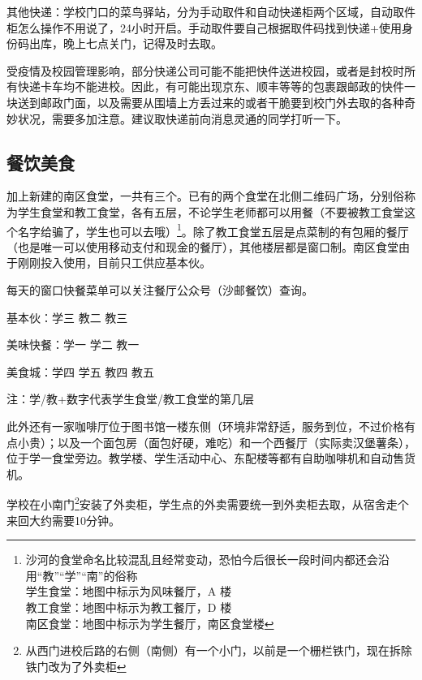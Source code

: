 其他快递：学校门口的菜鸟驿站，分为手动取件和自动快递柜两个区域，自动取件柜怎么操作不用说了，24小时开启。手动取件要自己根据取件码找到快递+使用身份码出库，晚上七点关门，记得及时去取。

受疫情及校园管理影响，部分快递公司可能不能把快件送进校园，或者是封校时所有快递卡车均不能进校。因此，有可能出现京东、顺丰等等的包裹跟邮政的快件一块送到邮政门面，以及需要从围墙上方丢过来的或者干脆要到校门外去取的各种奇妙状况，需要多加注意。建议取快递前向消息灵通的同学打听一下。

\subsection{餐饮美食}


加上新建的南区食堂，一共有三个。已有的两个食堂在北侧二维码广场，分别俗称为学生食堂和教工食堂，各有五层，不论学生老师都可以用餐（不要被教工食堂这个名字给骗了，学生也可以去哦）\footnote{沙河的食堂命名比较混乱且经常变动，恐怕今后很长一段时间内都还会沿用“教”“学”“南”的俗称\\\hspace*{4em}学生食堂：地图中标示为风味餐厅，A 楼\\\hspace*{4em}教工食堂：地图中标示为教工餐厅，D 楼\\\hspace*{4em}南区食堂：地图中标示为学生餐厅，南区食堂楼}。除了教工食堂五层是点菜制的有包厢的餐厅（也是唯一可以使用移动支付和现金的餐厅），其他楼层都是窗口制。南区食堂由于刚刚投入使用，目前只工供应基本伙。

每天的窗口快餐菜单可以关注餐厅公众号（沙邮餐饮）查询。

基本伙：学三 教二 教三

美味快餐：学一 学二 教一

美食城：学四 学五 教四 教五

注：学/教+数字代表学生食堂/教工食堂的第几层

此外还有一家咖啡厅位于图书馆一楼东侧（环境非常舒适，服务到位，不过价格有点小贵）；以及一个面包房（面包好硬，难吃）和一个西餐厅（实际卖汉堡薯条），位于学一食堂旁边。教学楼、学生活动中心、东配楼等都有自助咖啡机和自动售货机。


学校在小南门\footnote{从西门进校后路的右侧（南侧）有一个小门，以前是一个栅栏铁门，现在拆除铁门改为了外卖柜}安装了外卖柜，学生点的外卖需要统一到外卖柜去取，从宿舍走个来回大约需要10分钟。

